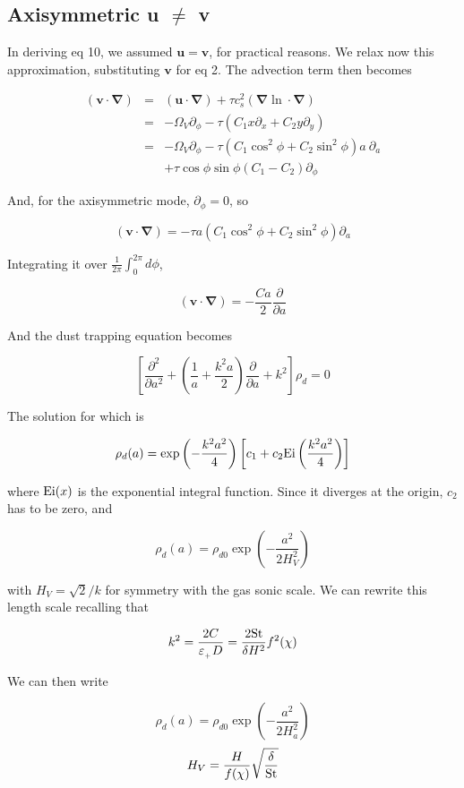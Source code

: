 \documentclass[useAMS,8pt,twocolumn]{article}
\newcommand{\pderiv}[2]{\frac{\partial #1}{\partial #2}}
\newcommand{\pderivn}[3]{\frac{\partial^{#3} #1}{\partial #2^{#3}}}
\renewcommand{\v}[1]{{\boldsymbol{#1}}} %
\newcommand{\del}{\v{\nabla}}
\newcommand{\grad}{\del}
\newcommand{\beq}{\begin{equation}}
\newcommand{\eeq}{\end{equation}}
\newcommand{\beqn}{\begin{eqnarray}}
\newcommand{\eeqn}{\end{eqnarray}}
\newcommand{\epsp}{\varepsilon_{_{+}}}
\begin{document}
\subsection{Axisymmetric u $\ne$ v }

In deriving eq 10, we assumed $\v{u}=\v{v}$, for practical reasons. We
relax now this approximation, substituting $\v{v}$ for eq 2. The
advection term then becomes 

\beqn
(\v{v}\cdot\del) &=& (\v{u}\cdot\del)  + \tau c_s^2 (\grad\ln \cdot
\del) \nonumber \\
&=& - \varOmega_V \partial_\phi - \tau \left( C_1 x \partial_x + C_2 y
  \partial_y\right) \nonumber \\
&=& - \varOmega_V \partial_\phi - \tau \left( C_1 \cos^2\phi   + C_2
  \sin^2\phi \right) a \ \partial_a \nonumber \\
&&+ \tau \cos\phi\sin\phi  (C_1 - C_2) \partial_\phi
\eeqn

And, for the axisymmetric mode, $\partial_\phi=0$, so

\beq
(\v{v}\cdot\del) = - \tau a \left( C_1 
  \cos^2\phi  + C_2  \sin^2\phi \right) \partial_a
\eeq

Integrating it over $\frac{1}{2\pi}\int_0^{2\pi} d\phi$, 

\beq
(\v{v}\cdot\del) = - \frac{C a}{2} \pderiv{}{a}
\eeq

And the dust trapping equation becomes 

\beq
\left[\pderivn{}{a}{2} + \left(\frac{1}{a} +
  \frac{k^2a}{2}\right)\pderiv{}{a} + k^2\right]\rho_d = 0 
\eeq

The solution for which is 

\beq
\rho_d(a) = \exp\left(-\frac{k^2a^2}{4}\right)  \left[c_1 + c_2 {\rm
    Ei}\left(\frac{k^2a^2}{4}\right)\right]
\eeq

\noindent where ${\rm Ei}(x)$ is the exponential integral function. 
Since it diverges at the origin, $c_2$ has to be zero, and 

\beq
\rho_d(a) = \rho_{d0} \exp\left(-\frac{a^2}{2H_V^2}\right)
\eeq

with $H_V = \sqrt{2}/k$ for symmetry with the gas sonic scale. We can 
rewrite this length scale recalling that 

\beqn
k^2 = \frac{2C}{\epsp D} = \frac{2{\rm St}}{\delta H^2} f^2(\chi)
\eeqn 

\noindent We can then write 

\beq\label{eq:gen_axi}
\rho_d(a) = \rho_{d0} \exp\left(-\frac{a^2}{2H_a^2}\right)
\eeq
\beq
 H_V = \frac{H}{f(\chi)} \sqrt{\frac{\delta}{\rm St}}
\eeq
\end{document}
